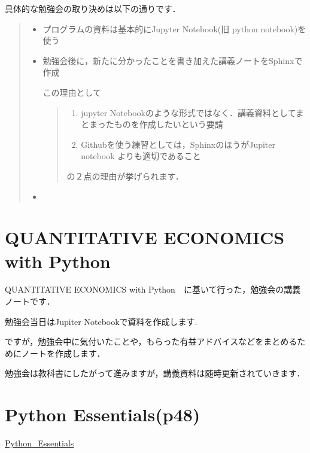 \documentclass[letterpaper,10pt,english]{sphinxmanual}
\begin{document}
具体的な勉強会の取り決めは以下の通りです．
\begin{quote}
\begin{itemize}
\item {} 
プログラムの資料は基本的にJupyter Notebook(旧 python notebook)を使う

\item {} 
勉強会後に，新たに分かったことを書き加えた講義ノートをSphinxで作成

この理由として
\begin{quote}
\begin{enumerate}
\item {} 
jupyter Notebookのような形式ではなく．講義資料としてまとまったものを作成したいという要請

\item {} 
Githubを使う練習としては，SphinxのほうがJupiter notebook よりも適切であること

\end{enumerate}

の２点の理由が挙げられます．
\end{quote}

\item {} 
\end{itemize}
\end{quote}


\chapter{QUANTITATIVE ECONOMICS with Python}
\label{chap2/preface:quantitative-economics-with-python}\label{chap2/preface::doc}
QUANTITATIVE ECONOMICS with Python　に基いて行った，勉強会の講義ノートです．

勉強会当日はJupiter Notebookで資料を作成します.

ですが，勉強会中に気付いたことや，もらった有益アドバイスなどをまとめるためにノートを作成します．

勉強会は教科書にしたがって進みますが，講義資料は随時更新されていきます．


\chapter{Python Essentials(p48)}
\label{chap2/python_essential/sec1::doc}\label{chap2/python_essential/sec1:python-essentials-p48}
\href{http://quant-econ.net/py/python\_essentials.html\#id3}{Python\_Essentials}
\begin{quote}
\end{quote}
\end{document}
